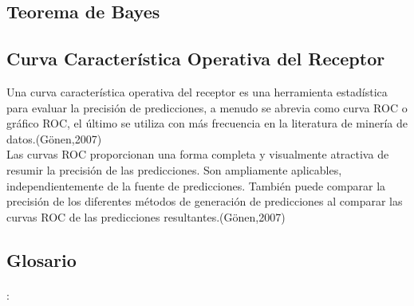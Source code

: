 \subsection{Teorema de Bayes}

\subsection{Curva Característica Operativa del Receptor}

Una curva característica operativa del receptor es una herramienta estadística para evaluar la precisión de predicciones, a menudo se abrevia como curva ROC o gráfico ROC, el último se utiliza con más frecuencia en la literatura de minería de datos.(Gönen,2007)\\

Las curvas ROC proporcionan una forma completa y visualmente atractiva de resumir la precisión de las predicciones. Son ampliamente aplicables, independientemente de la fuente de predicciones. También puede comparar la precisión de los diferentes métodos de generación de predicciones al comparar las curvas ROC de las predicciones resultantes.(Gönen,2007)

 
\subsection{Glosario}

\paragraph{}: 


